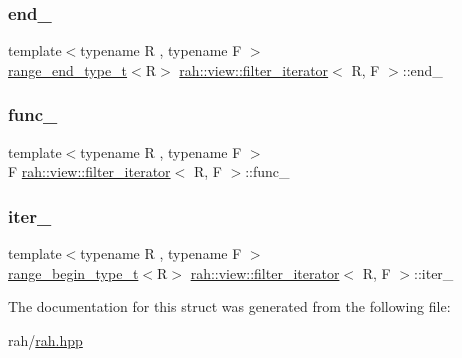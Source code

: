 \mbox{\label{structrah_1_1view_1_1filter__iterator_a69dcb1274e789cbe4074946ffe60fd7a}} 
\subsubsection{\texorpdfstring{end\_}{end\_}}
{\footnotesize\ttfamily template$<$typename R , typename F $>$ \\
\mbox{\hyperlink{namespacerah_a9657e24ae477f4482225b133fe286b65}{range\+\_\+end\+\_\+type\+\_\+t}}$<$R$>$ \mbox{\hyperlink{structrah_1_1view_1_1filter__iterator}{rah\+::view\+::filter\+\_\+iterator}}$<$ R, F $>$\+::end\+\_\+}

\mbox{\label{structrah_1_1view_1_1filter__iterator_af7b67ab1c3cb7d935e4292b4839e8435}} 
\subsubsection{\texorpdfstring{func\_}{func\_}}
{\footnotesize\ttfamily template$<$typename R , typename F $>$ \\
F \mbox{\hyperlink{structrah_1_1view_1_1filter__iterator}{rah\+::view\+::filter\+\_\+iterator}}$<$ R, F $>$\+::func\+\_\+}

\mbox{\label{structrah_1_1view_1_1filter__iterator_ad4016a695a004f72b1a942abd9193c71}} 
\subsubsection{\texorpdfstring{iter\_}{iter\_}}
{\footnotesize\ttfamily template$<$typename R , typename F $>$ \\
\mbox{\hyperlink{namespacerah_a28aff4eeddcece6be65ff0b956d32d4a}{range\+\_\+begin\+\_\+type\+\_\+t}}$<$R$>$ \mbox{\hyperlink{structrah_1_1view_1_1filter__iterator}{rah\+::view\+::filter\+\_\+iterator}}$<$ R, F $>$\+::iter\+\_\+}



The documentation for this struct was generated from the following file\+:\begin{DoxyCompactItemize}
\item 
rah/\mbox{\hyperlink{rah_8hpp}{rah.\+hpp}}\end{DoxyCompactItemize}
